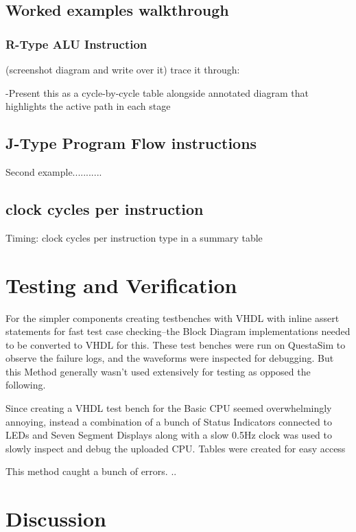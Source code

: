 \documentclass{article}
\begin{document}
\subsection{Worked examples walkthrough }

\subsubsection{R-Type ALU Instruction}
(screenshot diagram and write over it) trace it through: 

-Present this as a cycle-by-cycle table alongside annotated diagram that highlights the active path in each stage 

\subsection{J-Type Program Flow instructions}
Second example........... 

\subsection{clock cycles per instruction}

Timing: clock cycles per instruction type in a summary table 

\section{Testing and Verification}
For the simpler components creating testbenches with VHDL with inline assert statements for fast test case checking--the Block Diagram implementations needed to be converted to VHDL for this. These test benches were run on QuestaSim to observe the failure logs, and the waveforms were inspected for debugging. But this Method generally wasn't used extensively for testing as opposed the following. 

Since creating a VHDL test bench for the Basic CPU seemed overwhelmingly annoying, instead a combination of a bunch of Status Indicators connected to LEDs and Seven Segment Displays along with a slow 0.5Hz clock was used to slowly inspect and debug the uploaded CPU. Tables were created for easy access

This method caught a bunch of errors. ..


\section{Discussion}
\end{document}

